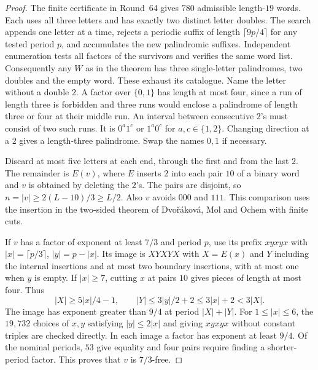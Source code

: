 \begin{proof}
The finite certificate in Round~64 gives \(780\) admissible length-\(19\) words. Each uses all three letters and has exactly two distinct letter doubles. The search appends one letter at a time, rejects a periodic suffix of length \(\lceil9p/4\rceil\) for any tested period \(p\), and accumulates the new palindromic suffixes. Independent enumeration tests all factors of the survivors and verifies the same word list. Consequently any \(W\) as in the theorem has three single-letter palindromes, two doubles and the empty word. These exhaust its catalogue. Name the letter without a double \(2\). A factor over \(\{0,1\}\) has length at most four, since a run of length three is forbidden and three runs would enclose a palindrome of length three or four at their middle run. An interval between consecutive \(2\)'s must consist of two such runs. It is \(0^a1^c\) or \(1^a0^c\) for \(a,c\in\{1,2\}\). Changing direction at a \(2\) gives a length-three palindrome. Swap the names \(0,1\) if necessary.

Discard at most five letters at each end, through the first and from the last \(2\). The remainder is \(E(v)\), where \(E\) inserts \(2\) into each pair \(10\) of a binary word and \(v\) is obtained by deleting the \(2\)'s. The pairs are disjoint, so \(n=|v|\ge2(L-10)/3\ge L/2\). Also \(v\) avoids \(000\) and \(111\). This comparison uses the insertion in the two-sided theorem of Dvo\v r\'akov\'a, Mol and Ochem \cite[Theorem~5]{DMO} with finite cuts.

If \(v\) has a factor of exponent at least \(7/3\) and period \(p\), use its prefix \(xyxyx\) with \(|x|=\lceil p/3\rceil\), \(|y|=p-|x|\). Its image is \(XYXYX\) with \(X=E(x)\) and \(Y\) including the internal insertions and at most two boundary insertions, with at most one when \(y\) is empty. If \(|x|\ge7\), cutting \(x\) at pairs \(10\) gives pieces of length at most four. Thus
\[
 |X|\ge5|x|/4-1,\qquad |Y|\le3|y|/2+2
                   \le3|x|+2<3|X|.
\]
The image has exponent greater than \(9/4\) at period \(|X|+|Y|\). For \(1\le|x|\le6\), the \(19{,}732\) choices of \(x,y\) satisfying \(|y|\le2|x|\) and giving \(xyxyx\) without constant triples are checked directly. In each image a factor has exponent at least \(9/4\). Of the nominal periods, \(53\) give equality and four pairs require finding a shorter-period factor. This proves that \(v\) is \(7/3\)-free.


\end{proof}
